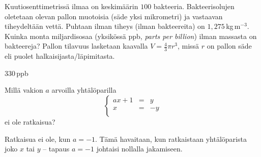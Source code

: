 \begin{tehtava}
	\begin{vastaus}
	\end{vastaus}
	\end{tehtava}
	
\begin{tehtava}
Kuutiosenttimetrissä ilmaa on keskimäärin $100$ bakteeria. Bakteerisolujen oletetaan olevan pallon muotoisia (säde yksi mikrometri) ja vastaavan tiheydeltään vettä. Puhtaan ilman tiheys (ilman bakteereita) on $1,275$\,kg\,m$^{-3}$. Kuinka monta miljardisosaa (yksikössä ppb, \textit{parts per billion}) ilman massasta on bakteereja? Pallon tilavuus lasketaan kaavalla $V=\frac{4}{3}\pi r^3$, missä $r$ on pallon säde eli puolet halkaisijasta/läpimitasta.
	\begin{vastaus}
	$330$\,ppb %
	\end{vastaus}
\end{tehtava}	

\begin{tehtava}
Millä vakion $a$ arvoilla yhtälöparilla 
$$\left\{    
    \begin{array}{rcl}
        ax+1&=&y \\
        x&=&-y \\
    \end{array}
    \right. $$
    ei ole ratkaisua?
	\begin{vastaus}
Ratkaisua ei ole, kun $a=-1$. Tämä havaitaan, kun ratkaistaan yhtälöparista joko $x$ tai $y$ -- tapaus $a=-1$ johtaisi nollalla jakamiseen.
	\end{vastaus}
\end{tehtava}
	
